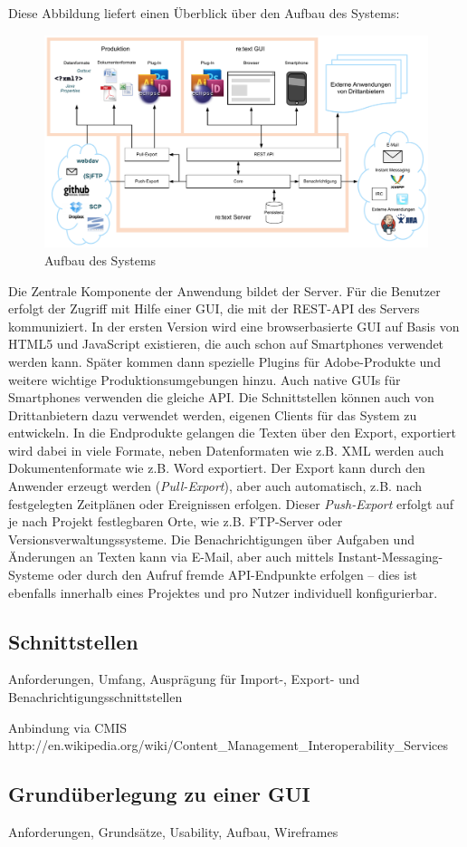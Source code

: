 Diese Abbildung liefert einen Überblick über den Aufbau des Systems:

\begin{figure}[htb]
\begin{center}
\includegraphics[width=\textwidth]{media/System.pdf}
\caption{Aufbau des Systems}
\label{chart:1}
\end{center}
\end{figure}

Die Zentrale Komponente der Anwendung bildet der Server. Für die Benutzer erfolgt der Zugriff mit Hilfe einer GUI, die mit der REST-API des Servers kommuniziert. In der ersten Version wird eine browserbasierte GUI auf Basis von HTML5 und JavaScript existieren, die auch schon auf Smartphones verwendet werden kann. Später kommen dann spezielle Plugins für Adobe-Produkte und weitere wichtige Produktionsumgebungen hinzu. Auch native GUIs für Smartphones verwenden die gleiche API. Die Schnittstellen können auch von Drittanbietern dazu verwendet werden, eigenen Clients für das System zu entwickeln. In die Endprodukte gelangen die Texten über den Export, exportiert wird dabei in viele Formate, neben Datenformaten wie z.B. XML werden auch Dokumentenformate wie z.B. Word exportiert. Der Export kann durch den Anwender erzeugt werden (\emph{Pull-Export}), aber auch automatisch, z.B. nach festgelegten Zeitplänen oder Ereignissen erfolgen. Dieser \emph{Push-Export} erfolgt auf je nach Projekt festlegbaren Orte, wie z.B. FTP-Server oder Versionsverwaltungssysteme. Die Benachrichtigungen über Aufgaben und Änderungen an Texten kann via E-Mail, aber auch mittels Instant-Messaging-Systeme oder durch den Aufruf fremde API-Endpunkte erfolgen – dies ist ebenfalls innerhalb eines Projektes und pro Nutzer individuell konfigurierbar.

\subsection{Schnittstellen}

Anforderungen, Umfang, Ausprägung für Import-, Export- und Benachrichtigungsschnittstellen

Anbindung via CMIS http://en.wikipedia.org/wiki/Content\_Management\_Interoperability\_Services

\subsection{Grundüberlegung zu einer GUI}

Anforderungen, Grundsätze, Usability, Aufbau, Wireframes
